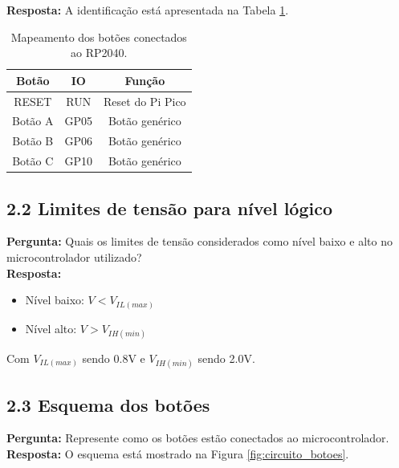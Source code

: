 \documentclass{article}
\begin{document}
\textbf{Resposta:}  
A identificação está apresentada na Tabela \ref{tab:botoes}.  

\begin{table}[H]
    \centering
    \begin{tabular}{ccc}
        \toprule
         Botão & IO   & Função \\
         \midrule
         RESET  & RUN  & Reset do Pi Pico \\
         Botão A & GP05 & Botão genérico \\
         Botão B & GP06 & Botão genérico \\
         Botão C & GP10 & Botão genérico \\
        \bottomrule
    \end{tabular}
    \caption{Mapeamento dos botões conectados ao RP2040.}
    \label{tab:botoes}
\end{table}

\subsection{2.2 Limites de tensão para nível lógico}
\textbf{Pergunta:} Quais os limites de tensão considerados como nível baixo e alto no microcontrolador utilizado? \\ 

\textbf{Resposta:}  
\begin{itemize}
    \item Nível baixo: $V < V_{IL(max)}$
    \item Nível alto: $V > V_{IH(min)}$
\end{itemize}

Com $V_{IL(max)}$ sendo 0.8V e $V_{IH(min)}$ sendo 2.0V.

\subsection{2.3 Esquema dos botões}
\textbf{Pergunta:} Represente como os botões estão conectados ao microcontrolador.  \\

\textbf{Resposta:}  
O esquema está mostrado na Figura \ref{fig:circuito_botoes}.  
\end{document}
